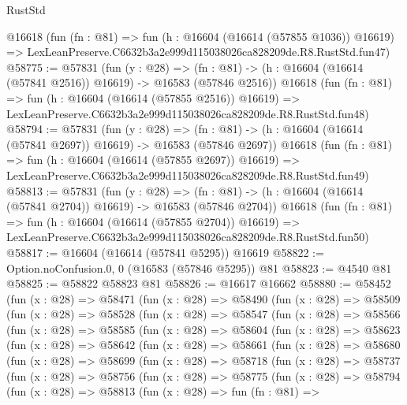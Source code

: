 \begin{lexlean}{RustStd}
\begin{coremodule}
    @16618
    (fun (fn : @81) =>
    fun (h : @16604 (@16614 (@57855 @1036)) @16619) =>
    LexLeanPreserve.C6632b3a2e999d115038026ca828209de.R8.RustStd.fun47)
@58775 := @57831
    (fun (y : @28) =>
    (fn : @81) -> (h : @16604 (@16614 (@57841 @2516)) @16619) -> @16583 (@57846 @2516))
    @16618
    (fun (fn : @81) =>
    fun (h : @16604 (@16614 (@57855 @2516)) @16619) =>
    LexLeanPreserve.C6632b3a2e999d115038026ca828209de.R8.RustStd.fun48)
@58794 := @57831
    (fun (y : @28) =>
    (fn : @81) -> (h : @16604 (@16614 (@57841 @2697)) @16619) -> @16583 (@57846 @2697))
    @16618
    (fun (fn : @81) =>
    fun (h : @16604 (@16614 (@57855 @2697)) @16619) =>
    LexLeanPreserve.C6632b3a2e999d115038026ca828209de.R8.RustStd.fun49)
@58813 := @57831
    (fun (y : @28) =>
    (fn : @81) -> (h : @16604 (@16614 (@57841 @2704)) @16619) -> @16583 (@57846 @2704))
    @16618
    (fun (fn : @81) =>
    fun (h : @16604 (@16614 (@57855 @2704)) @16619) =>
    LexLeanPreserve.C6632b3a2e999d115038026ca828209de.R8.RustStd.fun50)
@58817 := @16604 (@16614 (@57841 @5295)) @16619
@58822 := Option.noConfusion.{0, 0} (@16583 (@57846 @5295)) @81
@58823 := @4540 @81
@58825 := @58822 @58823 @81
@58826 := @16617 @16662
@58880 := @58452
    (fun (x : @28) =>
    @58471
      (fun (x : @28) =>
      @58490
        (fun (x : @28) =>
        @58509
          (fun (x : @28) =>
          @58528
            (fun (x : @28) =>
            @58547
              (fun (x : @28) =>
              @58566
                (fun (x : @28) =>
                @58585
                  (fun (x : @28) =>
                  @58604
                    (fun (x : @28) =>
                    @58623
                      (fun (x : @28) =>
                      @58642
                        (fun (x : @28) =>
                        @58661
                          (fun (x : @28) =>
                          @58680
                            (fun (x : @28) =>
                            @58699
                              (fun (x : @28) =>
                              @58718
                                (fun (x : @28) =>
                                @58737
                                  (fun (x : @28) =>
                                  @58756
                                    (fun (x : @28) =>
                                    @58775
                                      (fun (x : @28) =>
                                      @58794
                                        (fun (x : @28) =>
                                        @58813
                                          (fun (x : @28) =>
                                          fun (fn : @81) =>

\end{coremodule}
\end{lexlean}
